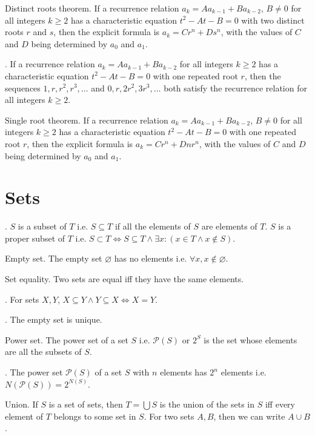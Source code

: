 \documentclass{slnotes}
\begin{document}
 Distinct roots theorem. If a recurrence relation \(a_k = Aa_{k-1} + Ba_{k-2}\), \(B \neq 0\) for all integers \(k \ge 2\) has a characteristic equation \(t^2 - At - B = 0\) with two distinct roots \(r\) and \(s\), then the explicit formula is \(a_k = Cr^n + Ds^n\), with the values of \(C\) and \(D\) being determined by \(a_0\) and \(a_1\).

. If a recurrence relation \(a_k = Aa_{k-1} + Ba_{k-2}\) for all integers \(k \ge 2\) has a characteristic equation \(t^2 - At - B = 0\) with one repeated root \(r\), then the sequences \(1, r, r^2, r^3, \hdots\) and \(0, r, 2r^2, 3r^3, \hdots\) both satisfy the recurrence relation for all integers \(k \ge 2\).

 Single root theorem. If a recurrence relation \(a_k = Aa_{k-1} + Ba_{k-2}\), \(B \neq 0\) for all integers \(k \ge 2\) has a characteristic equation \(t^2 - At - B = 0\) with one repeated root \(r\), then the explicit formula is \(a_k = Cr^n + Dnr^n\), with the values of \(C\) and \(D\) being determined by \(a_0\) and \(a_1\).

\chapter{Sets}
. \(S\) is a subset of \(T\) i.e. \(S \subseteq T\) if all the elements of \(S\) are elements of \(T\). \(S\) is a proper subset of \(T\) i.e. \(S \subset T \Leftrightarrow S \subseteq T \land \exists x : (x \in T \land x \not\in S)\).

 Empty set. The empty set \(\varnothing\) has no elements i.e. \(\forall x, x \not\in\varnothing\).

 Set equality. Two sets are equal iff they have the same elements.

. For sets \(X, Y\), \(X \subseteq Y \land Y \subseteq X \Leftrightarrow X = Y\).

. The empty set is unique.

 Power set. The power set of a set \(S\) i.e. \(\mathcal{P}(S)\) or \(2^S\) is the set whose elements are all the subsets of \(S\).

. The power set \(\mathcal{P}(S)\) of a set \(S\) with \(n\) elements has \(2^n\) elements i.e. \(N(\mathcal{P}(S)) = 2^{N(S)}\).

 Union. If \(S\) is a set of sets, then \(T = \bigcup S\) is the union of the sets in \(S\) iff every element of \(T\) belongs to some set in \(S\). For two sets \(A, B\), then we can write \(A \cup B\).
\end{document}
